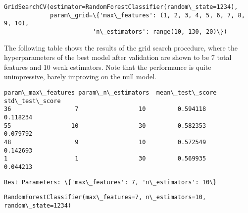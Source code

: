 \documentclass[11pt]{article}
\makeatletter
\newcommand{\boxspacing}{\kern\kvtcb@left@rule\kern\kvtcb@boxsep}
\newcommand{\prompt}[4]{
        {\ttfamily\llap{{\color{#2}[#3]:\hspace{3pt}#4}}\vspace{-\baselineskip}}
    }
\makeatother
\begin{document}
            \begin{tcolorbox}[breakable, size=fbox, boxrule=.5pt, pad at break*=1mm, opacityfill=0]
\prompt{Out}{outcolor}{33}{\boxspacing}
\begin{Verbatim}[commandchars=\\\{\}]
GridSearchCV(estimator=RandomForestClassifier(random\_state=1234),
             param\_grid=\{'max\_features': (1, 2, 3, 4, 5, 6, 7, 8, 9, 10),
                         'n\_estimators': range(10, 130, 20)\})
\end{Verbatim}
\end{tcolorbox}
        
    The following table shows the results of the grid search procedure,
where the hyperparameters of the best model after validation are shown
to be 7 total features and 10 weak estimators. Note that the performance
is quite unimpressive, barely improving on the null model.


            \begin{tcolorbox}[breakable, size=fbox, boxrule=.5pt, pad at break*=1mm, opacityfill=0]
\prompt{Out}{outcolor}{34}{\boxspacing}
\begin{Verbatim}[commandchars=\\\{\}]
   param\_max\_features param\_n\_estimators  mean\_test\_score  std\_test\_score
36                  7                 10         0.594118        0.118234
55                 10                 30         0.582353        0.079792
48                  9                 10         0.572549        0.142693
1                   1                 30         0.569935        0.044213
\end{Verbatim}
\end{tcolorbox}


    \begin{Verbatim}[commandchars=\\\{\}]
Best Parameters: \{'max\_features': 7, 'n\_estimators': 10\}
    \end{Verbatim}

            \begin{tcolorbox}[breakable, size=fbox, boxrule=.5pt, pad at break*=1mm, opacityfill=0]
\prompt{Out}{outcolor}{35}{\boxspacing}
\begin{Verbatim}[commandchars=\\\{\}]
RandomForestClassifier(max\_features=7, n\_estimators=10, random\_state=1234)
\end{Verbatim}
\end{tcolorbox}
        
\end{document}
